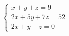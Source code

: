 \documentclass[preview]{standalone}
\begin{document}
\begin{align*}
\begin{cases} x+y+z=9 \\ 2x+5y+7z=52 \\ 2x+y-z=0 \end{cases}
\end{align*}
\end{document}
